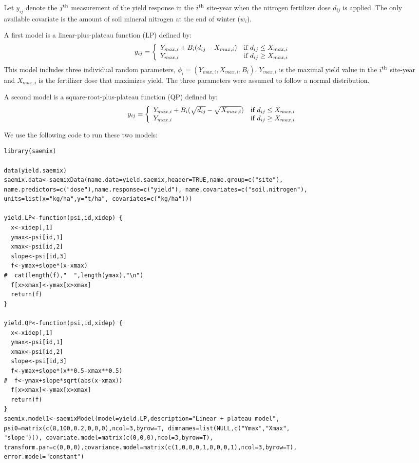 {Let $y_{ij}$ denote the $j^{\rm th}$ measurement of the yield response in the $i^{\rm th}$ site-year when the nitrogen fertilizer dose $d_{ij}$ is applied. The only available covariate is the amount of soil mineral nitrogen at the end of winter ($w_ i$).

A first model is a linear-plus-plateau function (LP) defined by:
\begin{equation}
y_{ij} = \left\{ \begin{array}{l r}
Y_{max,i} + B_i (d_{ij} - X_{max,i}) & \text{if } d_{ij} \leq X_{max,i} \\
Y_{max,i}  & \text{if } d_{ij} \geq X_{max,i} \\
         \end{array}
\right.
\end{equation}
This model includes three individual random parameters, $\phi_i = \left( Y_{max,i}, X_{max,i}, B_i \right)$. $Y_{max,i}$ is the maximal yield value in the $i^{\rm th}$ site-year and $X_{max,i}$ is the fertilizer dose that maximizes yield. The three parameters were assumed to follow a normal distribution.

A second model is a square-root-plus-plateau function (QP) defined by:
\begin{equation}
y_{ij} = \left\{ \begin{array}{l r}
Y_{max,i} + B_i (\sqrt{d_{ij}} - \sqrt{X_{max,i}}) & \text{if } d_{ij} \leq X_{max,i} \\
Y_{max,i}  & \text{if } d_{ij} \geq X_{max,i} \\
         \end{array}
\right.
\end{equation}

We use the following code to run these two models:
\begin{verbatim}
library(saemix)

data(yield.saemix)
saemix.data<-saemixData(name.data=yield.saemix,header=TRUE,name.group=c("site"), 
name.predictors=c("dose"),name.response=c("yield"), name.covariates=c("soil.nitrogen"), 
units=list(x="kg/ha",y="t/ha", covariates=c("kg/ha")))

yield.LP<-function(psi,id,xidep) {
  x<-xidep[,1]
  ymax<-psi[id,1]
  xmax<-psi[id,2]
  slope<-psi[id,3]
  f<-ymax+slope*(x-xmax)
#  cat(length(f),"  ",length(ymax),"\n")
  f[x>xmax]<-ymax[x>xmax]
  return(f)
}

yield.QP<-function(psi,id,xidep) {
  x<-xidep[,1]
  ymax<-psi[id,1]
  xmax<-psi[id,2]
  slope<-psi[id,3]
  f<-ymax+slope*(x**0.5-xmax**0.5)
#  f<-ymax+slope*sqrt(abs(x-xmax))
  f[x>xmax]<-ymax[x>xmax]
  return(f)
}
saemix.model1<-saemixModel(model=yield.LP,description="Linear + plateau model",  
psi0=matrix(c(8,100,0.2,0,0,0),ncol=3,byrow=T, dimnames=list(NULL,c("Ymax","Xmax", 
"slope"))), covariate.model=matrix(c(0,0,0),ncol=3,byrow=T), 
transform.par=c(0,0,0),covariance.model=matrix(c(1,0,0,0,1,0,0,0,1),ncol=3,byrow=T), 
error.model="constant")


\end{verbatim}}
